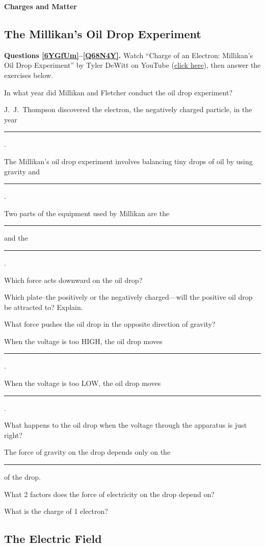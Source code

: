 \documentclass[]{exam}
\begin{document}
\textbf{\Large Charges and Matter}

\subsection{The Millikan's Oil Drop Experiment}

\textbf{Questions \ref{6YGfUm}--\ref{Q68N4Y}.} Watch ``Charge of an Electron: Millikan's Oil Drop Experiment'' by Tyler DeWitt on YouTube (\href{https://youtu.be/2HhaQtvICe8}{click here}), then answer the exercises below.

\begin{questions}
\question \label{6YGfUm}
In what year did Millikan and Fletcher conduct the oil drop experiment?


\question
J.~J.~Thompson discovered the electron, the negatively charged particle, in the year \rule{2cm}{0.15mm}.


\question
The Millikan's oil drop experiment involves balancing tiny drops of oil by using gravity and \rule{2cm}{0.15mm}.



\question
Two parts of the equipment used by Millikan are the \rule{2cm}{0.15mm} and the \rule{2cm}{0.15mm}.


\question
Which force acts downward on the oil drop?


\question
Which plate--the positively or the negatively charged---will the positive oil drop be attracted to? Explain.


\question
What force pushes the oil drop in the opposite direction of gravity?


\question
When the voltage is too HIGH, the oil drop moves \rule{2cm}{0.15mm}.


\question
When the voltage is too LOW, the oil drop moves \rule{2cm}{0.15mm}.


\question
What happens to the oil drop when the voltage through the apparatus is just right?


\question
The force of gravity on the drop depends only on the \rule{2cm}{0.15mm} of the drop.


\question
What 2 factors does the force of electricity on the drop depend on?


\question \label{Q68N4Y}
What is the charge of 1 electron?

\end{questions}



\clearpage
\subsection{The Electric Field}
\end{document}
